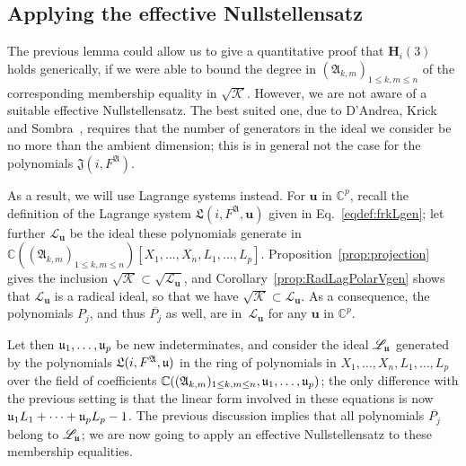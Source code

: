 \documentclass[12pt]{article}
\def\frkJ{\mathfrak{J}}
\def\frkL{\mathfrak{L}}
\def\A{\mathfrak{A}}
\def\C{\mathbb{C}}
\begin{document}

\subsection{Applying the effective Nullstellensatz}

The previous lemma could allow us to give a quantitative proof that
$\bm H_i(3)$ holds generically, if we were able to bound the degree in
$(\A_{k,m})_{1 \le k,m \le n}$ of the corresponding membership
equality in $\sqrt{\mathscr{K}}$. However, we are not aware of a
suitable effective Nullstellensatz. The best suited one, due to
D'Andrea, Krick and Sombra~\cite{EN}, requires that the number of
generators in the ideal we consider be no more than the ambient
dimension; this is in general not the case for the polynomials
${\frkJ}(i, F^\A)$.

As a result, we will use Lagrange systems instead. For $\bm u$ in
$\C^p$, recall the definition of the Lagrange system ${\frkL}(i, F^\A,
\bm u)$ given in Eq.~\eqref{eqdef:frkLgen}; let further
$\mathscr{L}_{\bm u}$ be the ideal these polynomials generate in
$\C((\A_{k,m})_{1 \le k,m \le n})[X_1,\dots,X_n,L_1,\dots,L_p]$.
Proposition~\ref{prop:projection} gives the inclusion $\sqrt{\mathscr{K}}
\subset \sqrt{\mathscr{L}_{\bm u}}$, and
Corollary~\ref{prop:RadLagPolarVgen} shows that $\mathscr{L}_{\bm u}$ is
a radical ideal, so that we have $\sqrt{\mathscr{K}} \subset
\mathscr{L}_{\bm u}$. As a consequence, the polynomials $P_j$, and
thus $\overline{P_j}$ as well, are in~$\mathscr{L}_{\bm u}$ for
any $\bm u$ in $\C^p$.

Let then $\frak u_1,\dots,\frak u_p$ be new indeterminates, and
consider the ideal $\mathscr{L}_{\bm{\frak u}}$ generated by the polynomials
${\frkL}(i, F^\A, \frak u)$ in the ring of polynomials in
$X_1,\dots,X_n,L_1,\dots,L_p$ over the field of coefficients
$\C((\A_{k,m})_{1 \le k,m \le n},\frak u_1,\dots,\frak u_p)$; the only
difference with the previous setting is that the linear form involved
in these equations is now $\frak u_1 L_1 + \cdots + \frak u_p
L_p-1$. The previous discussion implies that all polynomials
$\overline{P_j}$ belong to $\mathscr{L}_{\bm{\frak u}}$; we are now
going to apply an effective Nullstellensatz to these membership
equalities.
\end{document}
